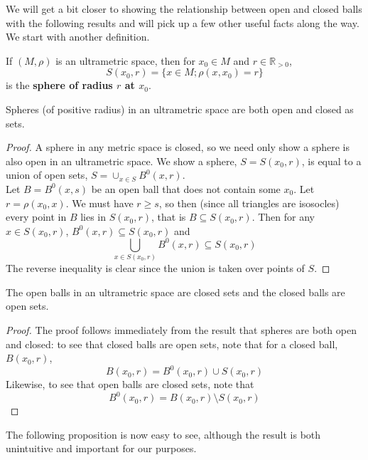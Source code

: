 We will get a bit closer to showing the relationship between open and closed balls with the following results and will pick up a few other useful facts along the way. We start with another definition.\\

\begin{definition}
	If $(M, \rho)$ is an ultrametric space, then for $x_0 \in M$ and $r \in \mathbb{R}_{> 0 }$, \[S(x_0,r) = \{x \in M; \rho(x,x_0) =r \}\] is the \textbf{sphere of radius $r$ at $x_0$}.
\end{definition}

\begin{lemma}
 Spheres (of positive radius) in an ultrametric space are both open and closed as sets.
\end{lemma}

\begin{proof}
	\cite{ar} A sphere in any metric space is closed, so we need only show a sphere is also open in an ultrametric space. We show a sphere, $S=S(x_0,r)$, is equal to a union of open sets, $S = \cup_{x\in S} B^0(x,r)$.\\
	
	Let $B=B^0(x,s)$ be an open ball that does not contain some $x_0$. Let $r=\rho(x_0,x)$. We must have $r \geq s$, so then (since all triangles are isosocles) every point in $B$ lies in $S(x_0,r)$, that is $B \subseteq S(x_0,r)$. Then for any $x \in S(x_0,r)$, $B^0(x,r) \subseteq S(x_0,r)$ and \[\bigcup_{x \in S(x_0,r)} B^0(x,r) \subseteq S(x_0,r)\] The reverse inequality is clear since the union is taken over points of $S$.
\end{proof}

\begin{proposition}
	The open balls in an ultrametric space are closed sets and the closed balls are open sets.
\end{proposition}

\begin{proof}
	The proof follows immediately from the result that spheres are both open and closed: to see that closed balls are open sets, note that for a closed ball, $B(x_0,r)$, \[B(x_0,r) = B^0(x_0,r) \cup S(x_0,r)\] Likewise, to see that open balls are closed sets, note that \[B^0(x_0,r) = B(x_0,r) \setminus S(x_0,r)\]
\end{proof}
The following proposition is now easy to see, although the result is both unintuitive and important for our purposes. \\

